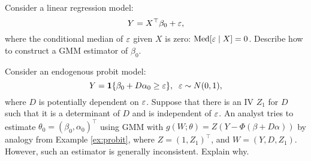 \documentclass[11pt, A4paper, openany, uplatex]{book}
\begin{document}
\hrulefill
\begin{exercise}\upshape
	Consider a linear regression model:
	\[
	Y = X^\top \beta_0 + \varepsilon,
	\]
	where the conditional median of $\varepsilon$ given $X$ is zero: $\text{Med}[\varepsilon \mid X] = 0$.
	Describe how to construct a GMM estimator of $\beta_0$. 
\end{exercise}

\begin{exercise}\upshape
	Consider an endogenous probit model:
	\[
		Y = \mathbf{1}\{\beta_0 + D \alpha_0 \ge \varepsilon\}, \;\; \varepsilon \sim N(0,1),
	\]
	where $D$ is potentially dependent on $\varepsilon$.
	Suppose that there is an IV $Z_1$ for $D$ such that it is a determinant of $D$ and is independent of $\varepsilon$. 
	An analyst tries to estimate $\theta_0 = (\beta_0, \alpha_0)^\top$ using GMM with $g(W; \theta) = Z(Y - \Phi(\beta + D \alpha))$ by analogy from Example \ref{ex:probit}, where $Z = (1, Z_1)^\top$, and $W = (Y,D,Z_1)$.
	However, such an estimator is generally inconsistent.
	Explain why.
\end{exercise}
\end{document}
